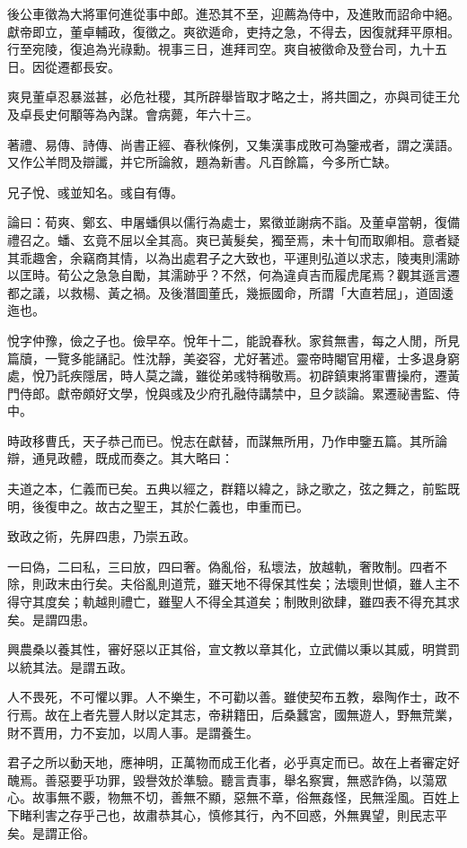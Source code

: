 \begin{pinyinscope}
後公車徵為大將軍何進從事中郎。進恐其不至，迎薦為侍中，及進敗而詔命中絕。獻帝即立，董卓輔政，復徵之。爽欲遁命，吏持之急，不得去，因復就拜平原相。行至宛陵，復追為光祿勳。視事三日，進拜司空。爽自被徵命及登台司，九十五日。因從遷都長安。

爽見董卓忍暴滋甚，必危社稷，其所辟舉皆取才略之士，將共圖之，亦與司徒王允及卓長史何顒等為內謀。會病薨，年六十三。

著禮、易傳、詩傳、尚書正經、春秋條例，又集漢事成敗可為鑒戒者，謂之漢語。又作公羊問及辯讖，并它所論敘，題為新書。凡百餘篇，今多所亡缺。

兄子悅、彧並知名。彧自有傳。

論曰：荀爽、鄭玄、申屠蟠俱以儒行為處士，累徵並謝病不詣。及董卓當朝，復備禮召之。蟠、玄竟不屈以全其高。爽已黃髮矣，獨至焉，未十旬而取卿相。意者疑其乖趣舍，余竊商其情，以為出處君子之大致也，平運則弘道以求志，陵夷則濡跡以匡時。荀公之急急自勵，其濡跡乎？不然，何為違貞吉而履虎尾焉？觀其遜言遷都之議，以救楊、黃之禍。及後潛圖董氏，幾振國命，所謂「大直若屈」，道固逶迤也。

悅字仲豫，儉之子也。儉早卒。悅年十二，能說春秋。家貧無書，每之人閒，所見篇牘，一覽多能誦記。性沈靜，美姿容，尤好著述。靈帝時閹官用權，士多退身窮處，悅乃託疾隱居，時人莫之識，雖從弟彧特稱敬焉。初辟鎮東將軍曹操府，遷黃門侍郎。獻帝頗好文學，悅與彧及少府孔融侍講禁中，旦夕談論。累遷祕書監、侍中。

時政移曹氏，天子恭己而已。悅志在獻替，而謀無所用，乃作申鑒五篇。其所論辯，通見政體，既成而奏之。其大略曰：

夫道之本，仁義而已矣。五典以經之，群籍以緯之，詠之歌之，弦之舞之，前監既明，後復申之。故古之聖王，其於仁義也，申重而已。

致政之術，先屏四患，乃崇五政。

一曰偽，二曰私，三曰放，四曰奢。偽亂俗，私壞法，放越軌，奢敗制。四者不除，則政末由行矣。夫俗亂則道荒，雖天地不得保其性矣；法壞則世傾，雖人主不得守其度矣；軌越則禮亡，雖聖人不得全其道矣；制敗則欲肆，雖四表不得充其求矣。是謂四患。

興農桑以養其性，審好惡以正其俗，宣文教以章其化，立武備以秉以其威，明賞罰以統其法。是謂五政。

人不畏死，不可懼以罪。人不樂生，不可勸以善。雖使契布五教，皋陶作士，政不行焉。故在上者先豐人財以定其志，帝耕籍田，后桑蠶宮，國無遊人，野無荒業，財不賈用，力不妄加，以周人事。是謂養生。

君子之所以動天地，應神明，正萬物而成王化者，必乎真定而已。故在上者審定好醜焉。善惡要乎功罪，毀譽效於準驗。聽言責事，舉名察實，無惑詐偽，以蕩眾心。故事無不覈，物無不切，善無不顯，惡無不章，俗無姦怪，民無淫風。百姓上下睹利害之存乎己也，故肅恭其心，慎修其行，內不回惑，外無異望，則民志平矣。是謂正俗。


\end{pinyinscope}
